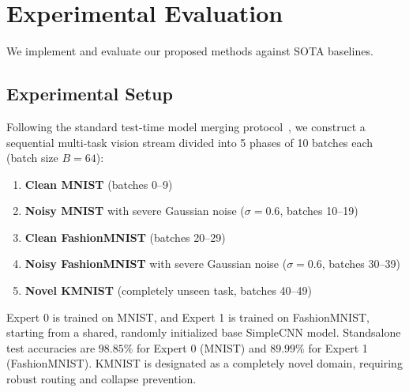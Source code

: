 \documentclass{article}
\theoremstyle{plain}
\theoremstyle{definition}
\theoremstyle{remark}
\begin{document}
\section{Experimental Evaluation}
\label{sec:experiments}

We implement and evaluate our proposed methods against SOTA baselines.

\subsection{Experimental Setup}
Following the standard test-time model merging protocol~\cite{anonymous}, we construct a sequential multi-task vision stream divided into 5 phases of 10 batches each (batch size $B=64$):
\begin{enumerate}
  \item \textbf{Clean MNIST} (batches 0--9)
  \item \textbf{Noisy MNIST} with severe Gaussian noise ($\sigma=0.6$, batches 10--19)
  \item \textbf{Clean FashionMNIST} (batches 20--29)
  \item \textbf{Noisy FashionMNIST} with severe Gaussian noise ($\sigma=0.6$, batches 30--39)
  \item \textbf{Novel KMNIST} (completely unseen task, batches 40--49)
\end{enumerate}

Expert 0 is trained on MNIST, and Expert 1 is trained on FashionMNIST, starting from a shared, randomly initialized base SimpleCNN model. Standsalone test accuracies are $98.85\%$ for Expert 0 (MNIST) and $89.99\%$ for Expert 1 (FashionMNIST). KMNIST is designated as a completely novel domain, requiring robust routing and collapse prevention.
\end{document}
